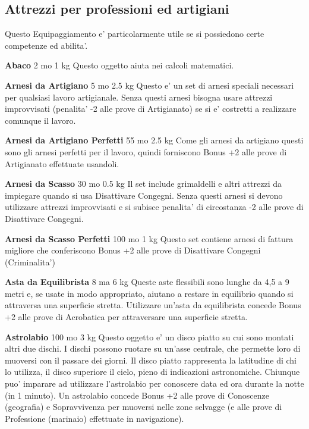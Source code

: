 \documentclass[a4paper,11pt,twoside,openany]{dndbook}
\begin{document}
{\pagebreak

\subsection{Attrezzi per professioni ed artigiani}

\label{attrezzi-per-professioni-ed-artigiani}

Questo Equipaggiamento e' particolarmente utile se si possiedono certe competenze ed abilita'.

\textbf{Abaco} 2 mo 1 kg Questo oggetto aiuta nei calcoli matematici.

\textbf{Arnesi da Artigiano} 5 mo 2.5 kg Questo e' un set di arnesi speciali necessari per qualsiasi lavoro artigianale. Senza questi arnesi bisogna usare attrezzi improvvisati (penalita' -2 alle prove di Artigianato) se si e' costretti a realizzare comunque il lavoro.

\textbf{Arnesi da Artigiano Perfetti} 55 mo 2.5 kg Come gli arnesi da artigiano questi sono gli arnesi perfetti per il lavoro, quindi forniscono Bonus +2 alle prove di Artigianato effettuate usandoli.

\textbf{Arnesi da Scasso} 30 mo 0.5 kg Il set include grimaldelli e altri attrezzi da impiegare quando si usa Disattivare Congegni. Senza questi arnesi si devono utilizzare attrezzi improvvisati e si subisce penalita' di circostanza -2 alle prove di Disattivare Congegni.

\textbf{Arnesi da Scasso Perfetti} 100 mo 1 kg Questo set contiene arnesi di fattura migliore che conferiscono Bonus +2 alle prove di Disattivare Congegni (Criminalita')

\textbf{Asta da Equilibrista} 8 ma 6 kg Queste aste flessibili sono lunghe da 4,5 a 9 metri e, se usate in modo appropriato, aiutano a restare in equilibrio quando si attraversa una superficie stretta. Utilizzare un'asta da equilibrista concede Bonus +2 alle prove di Acrobatica per attraversare una superficie stretta.

\textbf{Astrolabio} 100 mo 3 kg Questo oggetto e' un disco piatto su cui sono montati altri due dischi. I dischi possono ruotare su un'asse centrale, che permette loro di muoversi con il passare dei giorni. Il disco piatto rappresenta la latitudine di chi lo utilizza, il disco superiore il cielo, pieno di indicazioni astronomiche. Chiunque puo' imparare ad utilizzare l'astrolabio per conoscere data ed ora durante la notte (in 1 minuto). Un astrolabio concede Bonus +2 alle prove di Conoscenze (geografia) e Sopravvivenza per muoversi nelle zone selvagge (e alle prove di Professione (marinaio) effettuate in navigazione).

}
\end{document}
